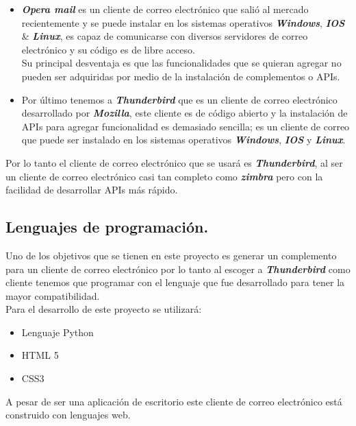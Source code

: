\documentclass[12pt,oneside,onecolumn,openany]{report}
\begin{document}
\begin{itemize}
 \item \textbf{\textit{Opera mail}} es un cliente de correo electrónico que salió al mercado recientemente y se puede instalar en los sistemas operativos \textbf{\textit{Windows}}, \textbf{\textit{IOS}} \& \textbf{\textit{Linux}}, es capaz de comunicarse con diversos servidores de correo electrónico y su código es de libre acceso.\\Su principal desventaja es que las funcionalidades que se quieran agregar no pueden ser adquiridas por medio de la instalación de complementos o APIs.\cite{opera}
 \item Por último tenemos a \textbf{\textit{Thunderbird}} que es un cliente de correo electrónico desarrollado por \textbf{\textit{Mozilla}}, este cliente es de código abierto y la instalación de APIs para agregar funcionalidad es demasiado sencilla; es un cliente de correo que puede ser instalado en los sistemas operativos \textbf{\textit{Windows}}, \textbf{\textit{IOS}} y \textbf{\textit{Linux}}.\cite{thun}
\end{itemize}
Por lo tanto el cliente de correo electrónico que se usará es \textbf{\textit{Thunderbird}}, al ser un cliente de correo electrónico casi tan completo como \textbf{\textit{zimbra}} pero con la facilidad de desarrollar APIs más rápido.\\
\subsection{Lenguajes de programación.}
Uno de los objetivos que se tienen en este proyecto es generar un complemento para un cliente de correo electrónico por lo tanto al escoger a \textbf{\textit{Thunderbird}} como cliente tenemos que programar con el lenguaje que fue desarrollado para tener la mayor compatibilidad.\\Para el desarrollo de este proyecto se utilizará\cite{thun}:
\begin{itemize}
 \item Lenguaje Python
 \item HTML 5
 \item CSS3
\end{itemize}
A pesar de ser una aplicación de escritorio este cliente de correo electrónico está construido con lenguajes web.
\end{document}
